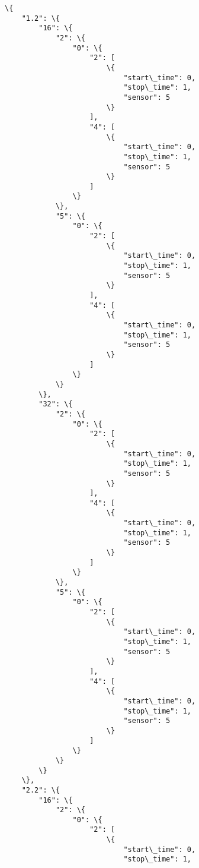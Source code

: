 \documentclass[11pt]{article}
\begin{document}
    \begin{Verbatim}[commandchars=\\\{\}]
\{
    "1.2": \{
        "16": \{
            "2": \{
                "0": \{
                    "2": [
                        \{
                            "start\_time": 0,
                            "stop\_time": 1,
                            "sensor": 5
                        \}
                    ],
                    "4": [
                        \{
                            "start\_time": 0,
                            "stop\_time": 1,
                            "sensor": 5
                        \}
                    ]
                \}
            \},
            "5": \{
                "0": \{
                    "2": [
                        \{
                            "start\_time": 0,
                            "stop\_time": 1,
                            "sensor": 5
                        \}
                    ],
                    "4": [
                        \{
                            "start\_time": 0,
                            "stop\_time": 1,
                            "sensor": 5
                        \}
                    ]
                \}
            \}
        \},
        "32": \{
            "2": \{
                "0": \{
                    "2": [
                        \{
                            "start\_time": 0,
                            "stop\_time": 1,
                            "sensor": 5
                        \}
                    ],
                    "4": [
                        \{
                            "start\_time": 0,
                            "stop\_time": 1,
                            "sensor": 5
                        \}
                    ]
                \}
            \},
            "5": \{
                "0": \{
                    "2": [
                        \{
                            "start\_time": 0,
                            "stop\_time": 1,
                            "sensor": 5
                        \}
                    ],
                    "4": [
                        \{
                            "start\_time": 0,
                            "stop\_time": 1,
                            "sensor": 5
                        \}
                    ]
                \}
            \}
        \}
    \},
    "2.2": \{
        "16": \{
            "2": \{
                "0": \{
                    "2": [
                        \{
                            "start\_time": 0,
                            "stop\_time": 1,

\end{Verbatim}
\end{document}
